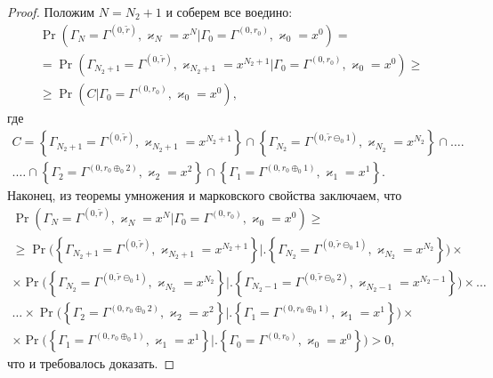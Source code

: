 \documentclass[a4paper,12pt,russian]{extarticle}
\begin{document}
\begin{proof}
Положим $N = N_2+1$ и соберем все воедино:
\begin{multline*}
\Pr(\Gamma_{N}=\Gamma^{(0,\tilde{r} )}, \varkappa_{N}=x^N|
\Gamma_{0}=\Gamma^{(0,r_0)}, \varkappa_{0}=x^0) = \\ =
\Pr(\Gamma_{ N_2+1}=\Gamma^{(0,\tilde{r} )}, \varkappa_{ N_2+1}=x^{N_2+1}|
\Gamma_{0}=\Gamma^{(0,r_0)}, \varkappa_{0}=x^0) \geqslant \\ 
\geqslant
\Pr(C|\Gamma_{0}=\Gamma^{(0,r_0)}, \varkappa_{0}=x^0),
\end{multline*}
где 
\begin{multline*}
    C = \left\{\Gamma_{ N_2+1}=\Gamma^{(0,\tilde{r} )}, \varkappa_{ N_2+1}=x^{N_2+1}\right\} \cap \left\{ \Gamma_{ N_2}=\Gamma^{(0,\tilde{r} \ominus_0 1 )}, \varkappa_{N_2}=x^{N_2}\right\} \cap\ldots \biggr.\\ \biggl.
\ldots \cap \left\{\Gamma_{2}=\Gamma^{(0,r_0\oplus_{0}2)},\varkappa_{2}=x^2\right\} \cap \left\{ \Gamma_{1}=\Gamma^{(0,r_0\oplus_{0}1)},\varkappa_{1}=x^1\right\}.
\end{multline*}
Наконец, из теоремы умножения и марковского свойства заключаем, что 
\begin{multline*}
\Pr(\Gamma_{N}=\Gamma^{(0,\tilde{r} )}, \varkappa_{N}=x^N |
\Gamma_{0}=\Gamma^{(0,r_0)}, \varkappa_{0}=x^0) \geqslant \\ 
\geqslant
\Pr\biggl(\left\{\Gamma_{ N_2+1}=\Gamma^{(0,\tilde{r} )}, \varkappa_{ N_2+1}=x^{N_2+1}\right\} \biggr|\biggl. \left\{ \Gamma_{ N_2}=\Gamma^{(0,\tilde{r} \ominus_0 1 )}, \varkappa_{N_2}=x^{N_2}\right\}\biggr) \times 
\\ \times
\Pr\biggl(\left\{\Gamma_{ N_2}=\Gamma^{(0,\tilde{r} \ominus_0 1 )}, \varkappa_{ N_2}=x^{N_2}\right\} \biggr|\biggl. \left\{ \Gamma_{ N_2-1}=\Gamma^{(0,\tilde{r} \ominus_0 2 )}, \varkappa_{N_2-1}=x^{N_2-1}\right\}\biggr) \times \ldots \\
\ldots\times 
\Pr\biggl(\left\{\Gamma_{2}=\Gamma^{(0,r_0\oplus_{0}2)},\varkappa_{2}=x^2\right\} \biggr|\biggl. \left\{ \Gamma_{1}=\Gamma^{(0,r_0\oplus_{0}1)},\varkappa_{1}=x^1\right\}\biggr) \times \\
\times
\Pr\biggl(\left\{\Gamma_{1}=\Gamma^{(0,r_0\oplus_{0}1)},\varkappa_{1}=x^1\right\} \biggr|\biggl. \left\{ \Gamma_{0}=\Gamma^{(0,r_0)},\varkappa_{0}=x^0\right\}\biggr)>0,
\end{multline*}
что и требовалось доказать.
\end{proof}
\end{document}
